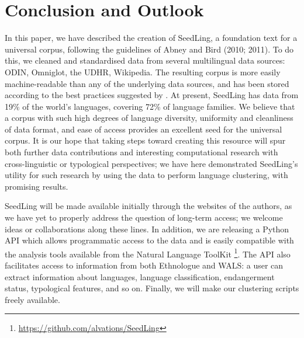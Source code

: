 \section{Conclusion and Outlook} \label{sec:conclusion}

In this paper, we have described the creation of SeedLing, a foundation text for a universal corpus, following the guidelines of Abney and Bird (2010; 2011). To do this, we cleaned and standardised data from several multilingual data sources: ODIN, Omniglot, the UDHR, Wikipedia. The resulting corpus is more easily machine-readable than any of the underlying data sources, and has been stored according to the best practices suggested by . At present, SeedLing has data from 19\% of the world's languages, covering 72\% of language families. We believe that a corpus with such high degrees of language diversity, uniformity and cleanliness of data format, and ease of access provides an excellent seed for the universal corpus. It is our hope that taking steps toward creating this resource will spur both further data contributions and interesting computational research with cross-linguistic or typological perspectives; we have here demonstrated SeedLing's utility for such research by using the data to perform language clustering, with promising results.

SeedLing will be made available initially through the websites of the authors, as we have yet to properly address the question of long-term access; we welcome ideas or collaborations along these lines. In addition, we are releasing a Python API which allows programmatic access to the data and is easily compatible with the analysis tools available from the Natural Language ToolKit \cite{BirdKleinLoper09} \footnote{\url{https://github.com/alvations/SeedLing}}. The API also facilitates access to information from both Ethnologue and WALS: a user can extract information about languages, language classification, endangerment status, typological features, and so on. Finally, we will make our clustering scripts freely available. 


